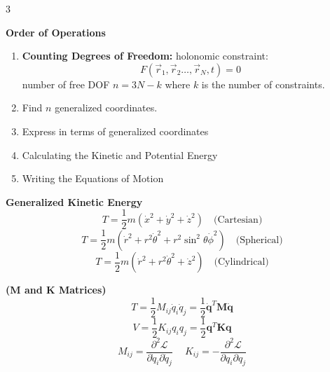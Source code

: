 \documentclass[1pt]{article}
\begin{document}
\begin{multicols}{3} %
\raggedcolumns
\setlength{\columnseprule}{0.1pt}
\scriptsize%
\noindent %
\abovedisplayskip=2pt
\belowdisplayskip=2pt


\textbf{ Order of Operations}
\begin{enumerate}[noitemsep, topsep=0pt]
    \item \textbf{Counting Degrees of Freedom:} 
holonomic constraint:
\begin{equation*}
    F\left(\vec{r}_1, \vec{r}_2 \ldots, \vec{r}_N, t\right)=0
\end{equation*}
number of free DOF \( n=3N-k \) where \( k \) is the number of constraints.
    \item{Find \( n \) generalized coordinates.}  
    \item{Express in terms of generalized coordinates}  
    \item{Calculating the Kinetic and Potential Energy}  
    \item {Writing the Equations of Motion}
    \end{enumerate}
\textbf{Generalized Kinetic Energy}
\begin{equation*}
    T = \frac{1}{2} m (\dot{x}^2 + \dot{y}^2 + \dot{z}^2) \quad \text{(Cartesian)}
\end{equation*}
\begin{equation*}
    T = \frac{1}{2} m (\dot{r}^2 + r^2 \dot{\theta}^2 + r^2 \sin^2 \theta \dot{\phi}^2) \quad \text{(Spherical)}
\end{equation*}
\begin{equation*}
    T = \frac{1}{2} m (\dot{r}^2 + r^2 \dot{\theta}^2 + \dot{z}^2) \quad \text{(Cylindrical)}
\end{equation*}

\textbf{ (M and K Matrices)}
\begin{equation*}
       T = \frac{1}{2} M_{ij} \dot{q}_i \dot{q}_j=\frac{1}{2} \mathbf{\dot{q}}^T \mathbf{M} \mathbf{\dot{q}}
\end{equation*}
\begin{equation*}
    V = \frac{1}{2} K_{ij} q_i q_j=\frac{1}{2} \mathbf{q}^T \mathbf{K} \mathbf{q}
\end{equation*}
\begin{equation*}
M_{ij} = \frac{\partial^2 \mathcal{L}}{\partial \dot{q}_i \partial \dot{q}_j} \ \quad
K_{ij} = -\frac{\partial^2 \mathcal{L}}{\partial q_i \partial q_j} 
\end{equation*}


\end{multicols}
\end{document}
